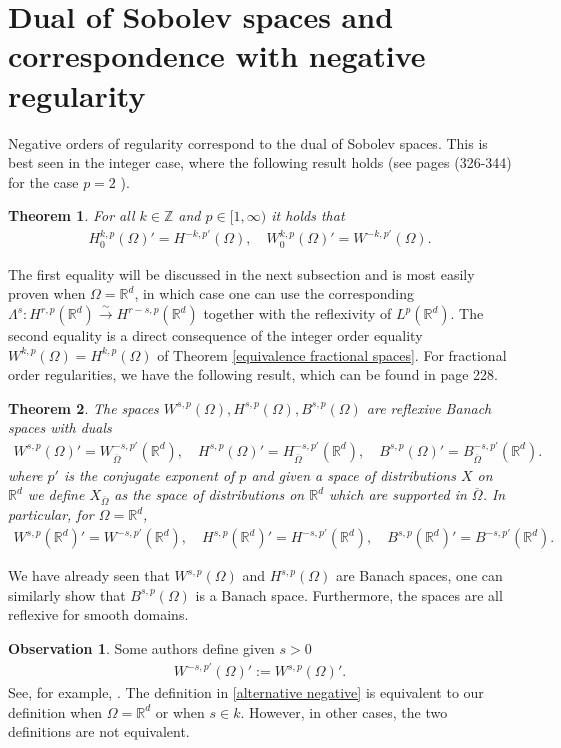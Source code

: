 \documentclass[
    a4paper,
    DIV=14,
    abstract=true,
    numbers=noenddot
]
{scrartcl}
\newtheorem{theorem}{Theorem}[section]
\theoremstyle{definition}
\newtheorem{observation}{Observation}
\newcommand{\iso}{\xrightarrow{\sim}}
\newcommand{\R}{\mathbb{R}}
\begin{document}
\section{Dual of Sobolev spaces and correspondence with negative regularity}
Negative orders of regularity correspond to the dual of Sobolev spaces. This is best seen in the integer case, where the following result holds (see \cite{evans2022partial} pages (326-344) for the case $p=2$ ).
\begin{theorem}\label{dual of integer sobolev}
  For all $k \in \mathbb{Z}$ and $p \in [1,\infty)$ it holds that
  \begin{align*}
    H^{k,p}_0(\Omega )' = H^{-k,p'}(\Omega ), \quad W^{k,p}_0(\Omega )' = W^{-k,p'}(\Omega ).
  \end{align*}
\end{theorem}
The first equality will be discussed in the next subsection and is most easily proven when $\Omega =\R^d$, in which case one can use the corresponding $\Lambda ^s: H^{r,p}(\R^d )\iso H^{r-s,p}(\R^d )$ together with the reflexivity of $L^p(\R^d )$. The second equality is a direct consequence of the integer order equality $W^{k,p}(\Omega )=H^{k,p}(\Omega )$ of Theorem \ref{equivalence fractional spaces}. For fractional order regularities, we have the following result, which can be found in \cite{agranovich2015sobolev} page 228.
\begin{theorem}
  The spaces $W^{s,p}(\Omega ),H^{s,p}(\Omega ),B^{s,p}(\Omega )$ are reflexive Banach spaces with duals
  \begin{align*}
    W^{s,p}(\Omega )'=	W^{-s,p'}_{\overline{\Omega } }(\R^d ), \quad H^{s,p}(\Omega )' = H^{-s,p'}_{\overline{\Omega } }(\R^d ), \quad B^{s,p}(\Omega )' = B^{-s,p'}_{\overline{\Omega } }(\R^d ).
  \end{align*}
  where $p'$ is the conjugate exponent of $p$ and given a space of distributions $X$ on $\R^d$ we define $X_{\overline{\Omega }}$ as the space of distributions on $\R^d$ which are supported in $\overline{\Omega }$. In particular, for $\Omega =\R^d$,
  \begin{align*}
    W^{s,p}(\R^d )'=	W^{-s,p'}(\R^d ), \quad H^{s,p}(\R^d )' = H^{-s,p'}(\R^d ), \quad B^{s,p}(\R^d )' = B^{-s,p'}(\R^d ).
  \end{align*}
\end{theorem}
We have already seen that $W^{s,p}(\Omega )$ and $H^{s,p}(\Omega )$ are Banach spaces, one can similarly show that $B^{s,p}(\Omega )$ is a Banach space. Furthermore, the spaces are all reflexive for smooth domains.
\begin{observation}
  Some authors define given $s>0$
  \begin{align}\label{alternative negative}
    W^{-s,p'}(\Omega )':=	W^{s,p}(\Omega )'.
  \end{align}
  See, for example, \cite{biccari2018local}. The definition in \eqref{alternative negative} is equivalent to our definition when $\Omega = \R^d$ or when $s \in k$. However, in other cases, the two definitions are not equivalent.
\end{observation}
\end{document}
